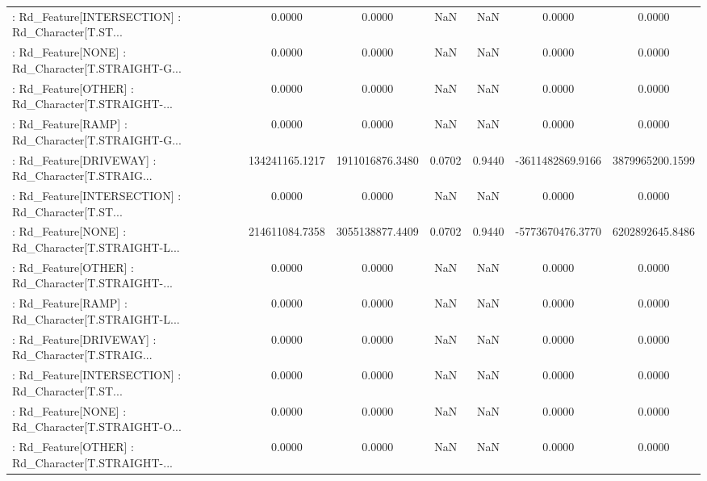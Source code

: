 \begin{longtable}{p{4cm}cccccc}
 : Rd\_Feature[INTERSECTION] : Rd\_Character[T.ST... &            0.0000 &            0.0000 &     NaN &          NaN &             0.0000 &            0.0000 \\
 : Rd\_Feature[NONE] : Rd\_Character[T.STRAIGHT-G... &            0.0000 &            0.0000 &     NaN &          NaN &             0.0000 &            0.0000 \\
 : Rd\_Feature[OTHER] : Rd\_Character[T.STRAIGHT-... &            0.0000 &            0.0000 &     NaN &          NaN &             0.0000 &            0.0000 \\
 : Rd\_Feature[RAMP] : Rd\_Character[T.STRAIGHT-G... &            0.0000 &            0.0000 &     NaN &          NaN &             0.0000 &            0.0000 \\
 : Rd\_Feature[DRIVEWAY] : Rd\_Character[T.STRAIG... &    134241165.1217 &   1911016876.3480 &  0.0702 &       0.9440 &   -3611482869.9166 &   3879965200.1599 \\
 : Rd\_Feature[INTERSECTION] : Rd\_Character[T.ST... &            0.0000 &            0.0000 &     NaN &          NaN &             0.0000 &            0.0000 \\
 : Rd\_Feature[NONE] : Rd\_Character[T.STRAIGHT-L... &    214611084.7358 &   3055138877.4409 &  0.0702 &       0.9440 &   -5773670476.3770 &   6202892645.8486 \\
 : Rd\_Feature[OTHER] : Rd\_Character[T.STRAIGHT-... &            0.0000 &            0.0000 &     NaN &          NaN &             0.0000 &            0.0000 \\
 : Rd\_Feature[RAMP] : Rd\_Character[T.STRAIGHT-L... &            0.0000 &            0.0000 &     NaN &          NaN &             0.0000 &            0.0000 \\
 : Rd\_Feature[DRIVEWAY] : Rd\_Character[T.STRAIG... &            0.0000 &            0.0000 &     NaN &          NaN &             0.0000 &            0.0000 \\
 : Rd\_Feature[INTERSECTION] : Rd\_Character[T.ST... &            0.0000 &            0.0000 &     NaN &          NaN &             0.0000 &            0.0000 \\
 : Rd\_Feature[NONE] : Rd\_Character[T.STRAIGHT-O... &            0.0000 &            0.0000 &     NaN &          NaN &             0.0000 &            0.0000 \\
 : Rd\_Feature[OTHER] : Rd\_Character[T.STRAIGHT-... &            0.0000 &            0.0000 &     NaN &          NaN &             0.0000 &            0.0000 \\

\end{longtable}
